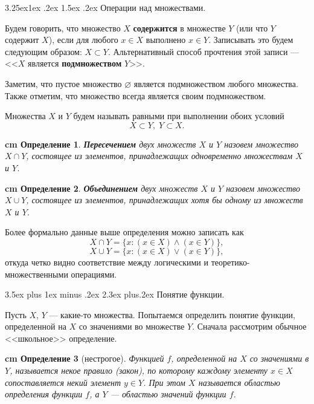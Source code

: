 \documentclass[12pt, russian]{article}
\makeatletter
\renewcommand\subsection{\@startsection {subsection}{2}{\parindent}%
{3.5ex plus 1ex minus .2ex}%
{2.3ex plus.2ex}%
{\normalfont\large\bfseries}}
\renewcommand\subsubsection{\@startsection{subsubsection}{3}{\parindent}%
	{3.25ex\@plus 1ex \@minus .2ex}%
	{1.5ex \@plus .2ex}%
	{\normalfont\large\bfseries}}
\newtheorem{definition}{\hskip 0.5 cm Определение}%
\makeatother
\begin{document}
\subsubsection{Операции над множествами.}

Будем говорить, что множество $X$ \textbf{содержится} в множестве $Y$ (или что $Y$ содержит $X$), если для любого $x \in X$ выполнено $x \in Y$. Записывать это будем следующим образом: $X \subset Y$. Альтернативный способ прочтения этой записи --- <<$X$ является \textbf{подмножеством} $Y$>>.

Заметим, что пустое множество $\varnothing$ является подмножеством любого множества. Также отметим, что множество всегда является своим подмножеством.

Множества $X$ и $Y$ будем называть равными при выполнении обоих условий
$$
X \subset Y, \; Y \subset X.
$$

\begin{definition}
	\textbf{Пересечением} двух множеств $X$ и $Y$ назовем множество $X \cap Y$, состоящее из элементов, принадлежащих одновременно множествам $X$ и $Y$.
\end{definition}
\begin{definition}
	\textbf{Объединением} двух множеств $X$ и $Y$ назовем множество $X \cup Y$, состоящее из элементов, принадлежащих хотя бы одному из множеств $X$ и $Y$.
\end{definition}
Более формально данные выше определения можно записать как
$$
X \cap Y = \{ x:  (x \in X) \wedge (x \in Y) \},
$$
$$
X \cup Y = \{ x:  (x \in X) \vee (x \in Y) \},
$$
откуда четко видно соответствие между логическими и теоретико-множественными операциями.

\subsection{Понятие функции.}

Пусть $X$, $Y$ --- какие-то множества. Попытаемся определить понятие функции, определенной на $X$ со значениями во множестве $Y$. Сначала рассмотрим обычное <<школьное>> определение.

\begin{definition}[нестрогое]
	Функцией $f$, определенной на $X$ со значениями в $Y$, называется некое \textit{правило} (закон), по которому каждому элементу $x \in X$ сопоставляется некий элемент $y \in Y$. При этом $X$ называется областью определения функции $f$, а $Y$ --- областью значений функции $f$.
\end{definition}




\newpage
\begin{thebibliography}{99}


\end{thebibliography}

\end{document}

